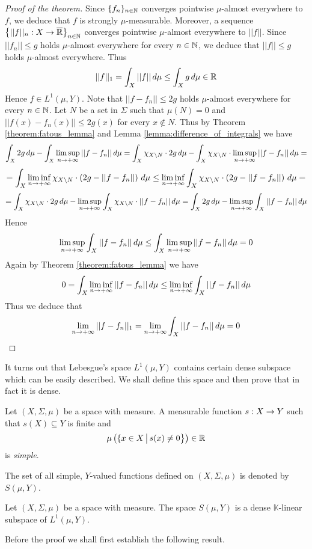 \begin{proof}[Proof of the theorem]
Since $\{f_n\}_{n\in {\mathbb N}}$ converges pointwise $\mu$-almost everywhere to $f$, we deduce that $f$ is strongly $\mu$-measurable. Moreover, a sequence $\big\{||f||_n:X\rightarrow \overline{{\mathbb R}}\big\}_{n\in {\mathbb N}}$ converges pointwise $\mu$-almost everywhere to $||f||$. Since $||f_n||\leq g$ holds $\mu$-almost everywhere for every $n\in {\mathbb N}$, we deduce that $||f||\leq g$ holds $\mu$-almost everywhere. Thus
$$||f||_1 = \int_X||f||\,d\mu \leq \int_Xg\,d\mu \in {\mathbb R}$$
Hence $f\in L^1(\mu, Y)$. Note that $||f - f_n|| \leq 2g$ holds $\mu$-almost everywhere for every $n\in {\mathbb N}$. Let $N$ be a set in $\Sigma$ such that $\mu(N) = 0$ and $||f(x) - f_n(x)|| \leq 2g(x)$ for every $x \not \in N$. Thus by Theorem \ref{theorem:fatous_lemma} and Lemma \ref{lemma:difference_of_integrals} we have
$$\int_X2g\,d\mu - \int_X\limsup_{n\rightarrow +\infty}||f-f_n||\,d\mu  = \int_X\chi_{X\setminus N}\cdot 2g\,d\mu - \int_X\chi_{X\setminus N}\cdot \limsup_{n\rightarrow +\infty}||f-f_n||\,d\mu = $$
$$= \int_X\liminf_{n\rightarrow +\infty}\chi_{X\setminus N}\cdot  \left(2g - ||f-f_n||\right)\,d\mu \leq \liminf_{n\rightarrow +\infty}\int_X\chi_{X\setminus N}\cdot \left(2g - ||f- f_n||\right)\,d\mu =$$
$$= \int_X\chi_{X\setminus N}\cdot 2g\,d\mu - \limsup_{n\rightarrow +\infty}\int_X\chi_{X\setminus N}\cdot||f-f_n||\,d\mu = \int_X2g\,d\mu - \limsup_{n\rightarrow +\infty}\int_X||f-f_n||\,d\mu$$
Hence
$$\limsup_{n\rightarrow +\infty}\int_X||f - f_n||\,d\mu \leq \int_X\limsup_{n\rightarrow +\infty}||f - f_n||\,d\mu = 0$$
Again by Theorem \ref{theorem:fatous_lemma} we have
$$0 = \int_X\liminf_{n\rightarrow +\infty}||f-f_n||\,d\mu \leq \liminf_{n\rightarrow +\infty} \int_X||f - f_n||\,d\mu$$
Thus we deduce that
$$\lim_{n\rightarrow +\infty}||f - f_n||_1 = \lim_{n\rightarrow +\infty}\int_X||f - f_n||\,d\mu = 0$$
\end{proof}
\noindent
It turns out that Lebesgue's space $L^1(\mu, Y)$ contains certain dense subspace which can be easily described. We shall define this space and then prove that in fact it is dense.

\begin{definition}
Let $(X,\Sigma, \mu)$ be a space with measure. A measurable function $s:X\rightarrow Y$ such that $s(X)\subseteq Y$ is finite and
$$\mu\left(\{x\in X\,\big|\,s(x)\neq 0\big\}\right) \in {\mathbb R}$$
is \textit{simple}.
\end{definition}
\noindent
The set of all simple, $Y$-valued functions defined on $(X,\Sigma, \mu)$ is denoted by $S(\mu, Y)$.

\begin{theorem}\label{theorem:simple_are_dense}
Let $(X,\Sigma, \mu)$ be a space with measure. The space $S(\mu, Y)$ is a dense $\mathbb{K}$-linear subspace of $L^1(\mu, Y)$.
\end{theorem}
\noindent
Before the proof we shall first establish the following result.

